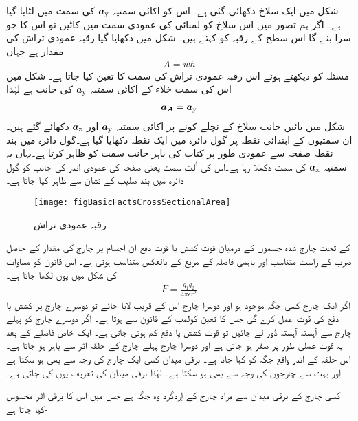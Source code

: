 شکل   میں ایک سلاخ دکھائی گئی ہے۔ اس کو اکائی سمتیہ ${\boldsymbol{a}}_{\textup{y}}$ کی سمت میں لٹایا گیا ہے۔ اگر ہم تصور میں اس سلاخ کو لمبائی کی عمودی سمت میں کاٹیں تو اس کا جو سرا بنے گا اس سطح کے رقبہ کو  کہتے ہیں۔ شکل میں دکھایا گیا رقبہ عمودی تراش  کی مقدار  ہے جہاں
\begin{align}
A=wh
\end{align}
مسئلہ کو دیکھتے ہوئے اس رقبہ عمودی تراش کی سمت کا تعین کیا جاتا ہے۔ شکل میں اس کی سمت   خلاء کے اکائی سمتیہ  ${\boldsymbol{a}}_{\textup{y}}$ کی جانب ہے لہٰذا
\begin{align}
{\ensuremath{{\boldsymbol{a_A}}}}={\boldsymbol{a}}_{\textup{y}}
\end{align}
شکل میں بائیں جانب سلاخ کے نچلے کونے پر اکائی سمتیہ  ${\boldsymbol{a}}_{\textup{y}}$  اور  ${\boldsymbol{a}}_{\textup{z}}$ دکھائے گئے ہیں۔ان سمتیوں کے ابتدائی نقطہ پر گول دائرہ میں ایک نقطہ دکھایا گیا ہے۔گول دائرہ میں بند نقطہ صفحہ سے عمودی طور پر کتاب کی باہر جانب سمت کو ظاہر کرتا ہے۔یہاں یہ سمتیہ  ${\boldsymbol{a}}_{\textup{x}}$ کی سمت دکھلا رہا ہے۔اس کی اُلٹ سمت یعنی صفحہ کی عمودی اندر کی جانب کو گول دائرہ میں بند صلیب کے نشان سے ظاہر کیا جاتا ہے۔
%
\begin{figure}
\centering
\texttt{[image: figBasicFactsCrossSectionalArea]}
\caption{رقبہ  عمودی تراش}
\label{شکل_حقائق_رقبہ_عمودی}
\end{figure}
%
 کے تحت چارج شدہ جسموں کے درمیان قوت کشش یا قوت دفع ان اجسام پر چارج کی مقدار کے حاصل ضرب کے راست متناسب اور باہمی فاصلہ کے مربع کے بالعکس متناسب ہوتی ہے۔ اس قانون کو مساوات کی شکل میں یوں لکھا جاتا ہے۔
\begin{align}\label{مساوات_بنیادی_کولمب_کا_قانون}
F=\frac{q_1 q_2}{4 \pi \epsilon r^2}
\end{align}
	اگر ایک چارج کسی جگہ موجود ہو اور دوسرا چارج اس کے قریب لایا جائے تو دوسرے چارج پر کشش یا دفع کی قوت عمل کرے گی جس کا تعین کولمب کے قانون سے ہوتا ہے۔ اگر دوسرے چارج کو پہلے چارج سے آہستہ آہستہ دُور لے جائیں تو قوت کشش یا دفع کم ہوتی جاتی ہے۔ ایک خاص فاصلے کے بعد یہ قوت عملی طور پر صفر ہو جاتی ہے اور دوسرا چارج پہلے چارج کے حلقہ اثر سے باہر ہو جاتا ہے۔ اس حلقہ کے اندر واقع جگہ کو  کہا جاتا ہے۔ برقی میدان کسی ایک چارج کی وجہ سے بھی ہو سکتا ہے اور بہت سے چارجوں کی وجہ سے بھی ہو سکتا ہے۔ لہٰذا برقی میدان کی تعریف یوں کی جاتی ہے۔

 کسی چارج کے برقی میدان سے مراد چارج کے اِردگرد وہ جگہ ہے جس میں اس کا برقی اثر محسوس کیا جاتا ہے-

